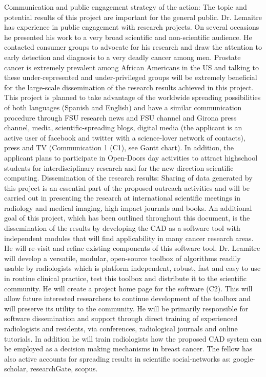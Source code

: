 Communication and public engagement strategy of the action: The topic and potential results of this project are important for the general public. Dr. Lemaitre has experience in public engagement with research projects. On several occasions he presented his work to a very broad scientific and non-scientific audience.  He contacted consumer groups to advocate for his research and draw the attention to early detection and diagnosis to a very deadly cancer among men.  Prostate cancer is extremely prevalent among African Americans in the US and talking to these under-represented and under-privileged groups will be extremely beneficial for the large-scale dissemination of the research results achieved in this project. This project is planned to take advantage of the worldwide spreading possibilities of both languages (Spanish and English) and have a similar communication procedure through FSU research news and FSU channel and Girona press channel, media, scientific-spreading blogs, digital media (the applicant is an active user of facebook and twitter with a science-lover network of contacts), press and TV (Communication 1 (C1), see Gantt chart). In addition, the applicant plans to participate in Open-Doors day activities to attract highschool students for interdisciplinary research and for the new direction scientific computing.
Dissemination of the research results: Sharing of data generated by this project is an essential part of the proposed outreach activities and will be carried out in presenting the research at international scientific meetings in radiology and medical imaging, high impact journals and books.
An additional goal of this project, which has been outlined throughout this document, is the dissemination of the results by developing the CAD as a software tool  with independent modules that will find applicability in many cancer research areas.  He will re-visit and refine existing components of this software tool.  Dr. Leamitre  will develop a versatile, modular, open-source toolbox of algorithms readily usable by radiologists which is platform independent, robust, fast and easy to use in routine clinical practice, test this toolbox and distribute it to the scientific community. He will create a project home page for the software (C2). This will allow future interested researchers   to continue development of the toolbox and will preserve its utility to the community.  He will  be primarily  responsible  for  software  dissemination  and  support  through  direct training of experienced radiologists and residents, via conferences, radiological journals and online tutorials. In addition he will train radiologists how the proposed CAD system can be employed as a decision making mechanisms in breast cancer.
The fellow has also active accounts for spreading results in scientific social-networks as: google-scholar, researchGate, scopus.

